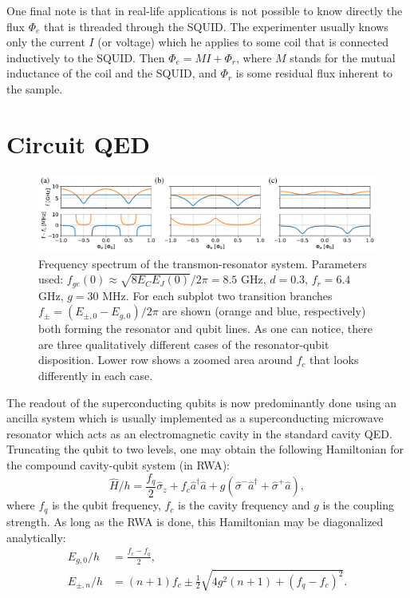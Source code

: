 \documentclass[%
 aip,
 draft,
 amsmath,amssymb,
 reprint,%
]{revtex4-1}
\begin{document}
One final note is that in real-life applications is not possible to know directly the flux $\Phi_e$ that is threaded through the SQUID. The experimenter usually knows only the current $I$ (or voltage) which he applies to some coil that is connected inductively to the SQUID. Then $\Phi_e = M I + \Phi_r$, where $M$ stands for the mutual inductance of the coil and the SQUID, and $\Phi_r$ is some residual flux inherent to the sample.

\section{Circuit QED}\label{sec:cqed}


\begin{figure}
	\centering
	\includegraphics[width=\textwidth]{anti_theor}
	\caption{Frequency spectrum of the transmon-resonator system. Parameters used: $f_{ge}(0) \approx \sqrt{8E_C E_J(0)}/2\pi = 8.5$ GHz, $d=0.3$, $f_r=6.4$ GHz, $g = 30$ MHz. For each subplot two transition branches  $f_{\pm} = (E_{\pm,0} - E_{g,0})/2\pi$ are shown (orange and blue, respectively) both forming the resonator and qubit lines. As one can notice, there are three qualitatively different cases of the resonator-qubit disposition. Lower row shows a zoomed area around $f_c$ that looks differently in each case.}
	\label{fig:anti_theor}
\end{figure}

The readout of the superconducting qubits is now predominantly done using an ancilla system which is usually implemented as a superconducting microwave resonator which acts as an electromagnetic cavity in the standard cavity QED. Truncating the qubit to two levels, one may obtain the following Hamiltonian for the compound cavity-qubit system (in RWA):
\begin{equation}
\hat H/h = \frac{f_q}{2} \hat \sigma_z + f_c \hat a^\dagger \hat a + g(\hat \sigma^- \hat a^\dagger + \hat \sigma^+ \hat a),
\end{equation}
where $f_q$ is the qubit frequency, $f_c$ is the cavity frequency and $g$ is the coupling strength. As long as the RWA is done, this Hamiltonian may be diagonalized analytically\cite{blais2004}:
\begin{align}
E_{g, 0}/h &= \frac{f_c - f_q}{2},\label{eq:branches1}
\\
E_{\pm, n}/h &= (n+1)f_c \pm \frac{1}{2}\sqrt{4g^2(n+1)+(f_q-f_c)^2}.
\label{eq:branches2}
\end{align}
\end{document}
